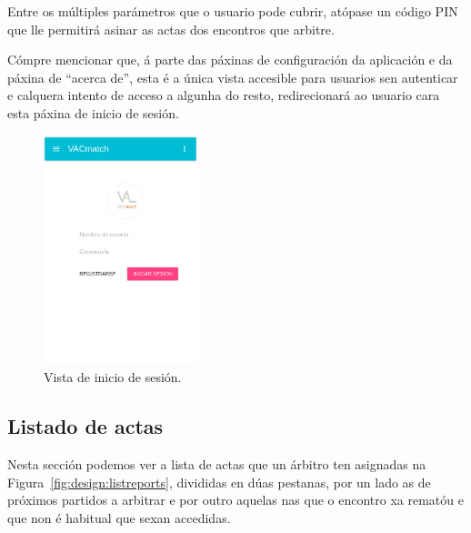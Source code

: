     Entre os múltiples parámetros que o usuario pode cubrir, atópase un código 
PIN que lle permitirá asinar as actas dos encontros que arbitre.

    Cómpre mencionar que, á parte das páxinas de configuración da aplicación e 
da páxina de ``acerca de'', esta é a única vista accesible para usuarios sen 
autenticar e calquera intento de acceso a algunha do resto, 
redirecionará ao usuario cara esta páxina de inicio de sesión.

      \begin{figure}[h!]
        \begin{center}
        \includegraphics[width=0.4\textwidth]{./img/demo/6_login.png}
        \caption{Vista de inicio de sesión.}
        \label{fig:design:login}
        \end{center}
      \end{figure}

    \subsection{Listado de actas}
    Nesta sección podemos ver a lista de actas que un árbitro ten 
asignadas na Figura~\ref{fig:design:listreports}, divididas en dúas pestanas, 
por un lado as de próximos partidos a 
arbitrar e por outro aquelas nas que o encontro xa rematóu e que non é habitual 
que sexan accedidas.

